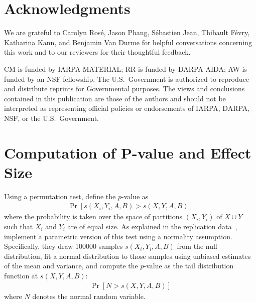 \documentclass[11pt,a4paper]{article}
\begin{document}
\section*{Acknowledgments}

We are grateful to Carolyn Ros\'{e}, Jason Phang, S\'{e}bastien Jean, Thibault F\'{e}vry, Katharina Kann, and Benjamin Van Durme for helpful conversations concerning this work and to our reviewers for their thoughtful feedback.

CM is funded by IARPA MATERIAL;
RR is funded by DARPA AIDA;
AW is funded by an NSF fellowship.
The U.S.\ Government is authorized to
reproduce and distribute reprints for Governmental purposes. The views
and conclusions contained in this publication are those of the authors
and should not be interpreted as representing official policies or
endorsements of IARPA, DARPA, NSF, or the U.S.\ Government.




\appendix

\section{Computation of P-value and Effect Size}

Using a permutation test, \citet{caliskan2017semantics} define the $p$-value as
\begin{align*}
\Pr \left[s(X_i, Y_i, A, B) > s(X, Y, A, B)\right]
\end{align*}
where the probability is taken over the space of partitions $(X_i, Y_i)$ of $X \cup Y$ such that $X_i$ and $Y_i$ are of equal size.
As explained in the replication data~\cite{caliskan2017replication},
\citet{caliskan2017semantics} implement a parametric version of this test using a normality assumption.
Specifically, they draw \num{100000} samples $s(X_i, Y_i, A, B)$ from the null distribution, fit a normal distribution to those samples using unbiased estimates of the mean and variance, and compute the $p$-value as the tail distribution function at $s(X, Y, A, B)$:
\begin{align*}
\Pr\left[N > s(X, Y, A, B)\right]
\end{align*}
where $N$ denotes the normal random variable.
\end{document}
